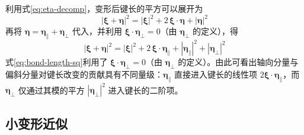 利用式\eqref{eq:eta-decomp}，变形后键长的平方可以展开为
\begin{equation}
  |\boldsymbol{\xi}+\boldsymbol{\eta}|^{2}=|\boldsymbol{\xi}|^{2}+2\,\boldsymbol{\xi}\cdot\boldsymbol{\eta}+|\boldsymbol{\eta}|^{2}
  \label{eq:bond-length-expand}
\end{equation}
再将 $\boldsymbol{\eta}=\boldsymbol{\eta}_{\parallel}+\boldsymbol{\eta}_{\perp}$ 代入，并利用 $\boldsymbol{\xi}\cdot\boldsymbol{\eta}_{\perp}=0$（由 $\boldsymbol{\eta}_{\perp}$ 的定义），得
\begin{equation}
  |\boldsymbol{\xi}+\boldsymbol{\eta}|^{2}=|\boldsymbol{\xi}|^{2}+2\,\boldsymbol{\xi}\cdot\boldsymbol{\eta}_{\parallel}+|\boldsymbol{\eta}_{\parallel}|^{2}+|\boldsymbol{\eta}_{\perp}|^{2}
  \label{eq:bond-length-sq}
\end{equation}
式\eqref{eq:bond-length-sq}利用了 $\boldsymbol{\xi}\cdot\boldsymbol{\eta}_{\perp}=0$（由 $\boldsymbol{\eta}_{\perp}$ 的定义）。由此可看出轴向分量与偏斜分量对键长改变的贡献具有不同量级：$\boldsymbol{\eta}_{\parallel}$ 直接进入键长的线性项 $2\boldsymbol{\xi}\cdot\boldsymbol{\eta}_{\parallel}$，而 $\boldsymbol{\eta}_{\perp}$ 仅通过其模的平方 $|\boldsymbol{\eta}_{\perp}|^{2}$ 进入键长的二阶项。

\subsection{小变形近似}

